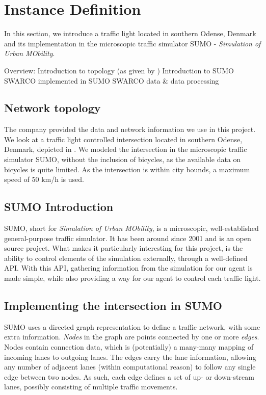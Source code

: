 \section{Instance Definition}

In this section, we introduce a traffic light located in southern Odense, Denmark and its implementation in the microscopic traffic simulator SUMO - \textit{Simulation of Urban MObility}. 

Overview: 
Introduction to topology (as given by \swarco)
Introduction to SUMO
SWARCO implemented in SUMO
SWARCO data & data processing

\subsection{Network topology}
The company \swarco provided the data and network information we use in this project. We look at a traffic light controlled intersection located in southern Odense, Denmark, depicted in . We modeled the intersection in the microscopic traffic simulator SUMO, without the inclusion of bicycles, as the available data on bicycles is quite limited.
As the intersection is within city bounds, a maximum speed of 50 km/h is used. 

\begin{figure}[!htb]
\end{figure}


\subsection{SUMO Introduction}
SUMO, short for \textit{Simulation of Urban MObility}, is a microscopic, well-established general-purpose traffic simulator. It has been around since 2001 and is an open source project. What makes it particularly interesting for this project, is the ability to control elements of the simulation externally, through a well-defined API. With this API, gathering information from the simulation for our agent is made simple, while also providing a way for our agent to control each traffic light.

\subsection{Implementing the intersection in SUMO}
SUMO uses a directed graph representation to define a traffic network, with some extra information. 
\textit{Nodes}  in the graph are points connected by one or more \textit{edges}. Nodes contain connection data, which is (potentially) a many-many mapping of incoming lanes to outgoing lanes. The edges carry the lane information, allowing any number of adjacent lanes (within computational reason) to follow any single edge between two nodes. As such, each edge defines a set of up- or down-stream lanes, possibly consisting of multiple traffic movements.



